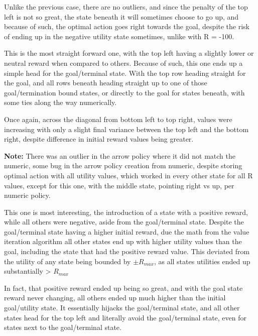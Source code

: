 \documentclass[12pt]{article}
\begin{document}
\begin{description}[leftmargin=0cm]
		Unlike the previous case, there are no outliers, and since the penalty of the top
		left is not so great, the state beneath it will sometimes choose to go up, and
		because of such, the optimal action goes right towards the goal, despite the risk
		of ending up in the negative utility state sometimes, unlike with R = -100.


	\item[When R = 0] \hfill \break
		This is the most straight forward one, with the top left having a slightly lower
		or neutral reward when compared to others. Because of such, this one ends up a
		simple head for the goal/terminal state. With the top row heading straight for
		the goal, and all rows beneath heading straight up to one of those goal/termination
		bound states, or directly to the goal for states beneath, with some ties along the way
		numerically.
		
		Once again, across the diagonal from bottom left to top right, values were increasing
		with only a slight final variance between the top left and the bottom right, despite
		difference in initial reward values being greater.
		
		\textbf{Note:} There was an outlier in the arrow policy where it did not match the
		numeric, some bug in the arrow policy creation from numeric, despite storing optimal
		action with all utility values, which worked in every other state for all R values,
		except for this one, with the middle state, pointing right vs up, per numeric policy.
		
		
	\item[When R = +3] \hfill \break
		This one is most interesting, the introduction of a state with a positive reward, while
		all others were negative, aside from the goal/terminal state. Despite the goal/terminal
		state having a higher initial reward, due the math from the value iteration algorithm
		all other states end up with higher utility values than the goal, including the state
		that had the positive reward value. This deviated from the utility of any state being
		bounded by $\pm R_{max}$, as all states utilities ended up substantially > $R_{max}$
		
		In fact, that positive reward ended up being so great, and with the goal state reward
		never changing, all others ended up much higher than the initial goal/utility state.
		It essentially hijacks the goal/terminal state, and all other states head for the 
		top left and literally avoid the goal/terminal state, even for states next to the
		goal/terminal state.
		

\end{description}
\end{document}
